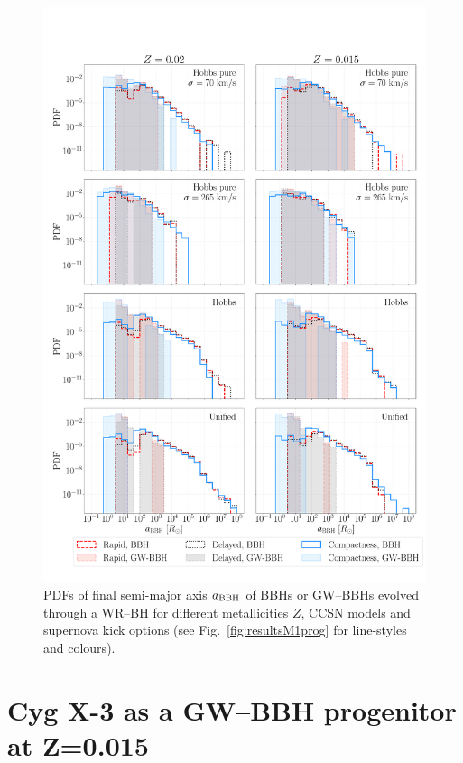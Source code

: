 \documentclass[a4paper,titlepage]{book}     	%
\begin{document}
\begin{figure}[h]
	\centering
	\includegraphics[width=\textwidth]{./images/rema.pdf}	
	\caption{PDFs of final semi-major axis $a_{\rm BBH}$ of BBHs or GW--BBHs evolved through a WR--BH for different metallicities $Z$, CCSN models and supernova kick options (see Fig.\ \ref{fig:resultsM1prog} for line-styles and colours).}\label{fig:resultsarem}
\end{figure}



\clearpage




\section{Cyg X-3 as a GW--BBH progenitor at Z=0.015}\label{sec:CygX3vsGWBBHsproperties}
\end{document}
